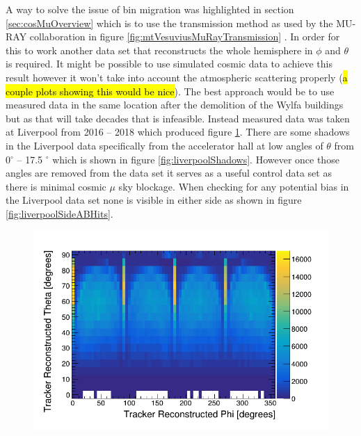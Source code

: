 A way to solve the issue of bin migration was highlighted in section \ref{sec:cosMuOverview} which is to use the transmission method as used by the MU-RAY collaboration in figure \ref{fig:mtVesuviusMuRayTransmission} \cite{Ambrosino_2014}. In order for this to work  another data set that reconstructs the whole hemisphere in $\phi$ and $\theta$ is required. It might be possible to use simulated cosmic data to achieve this result however it won't take into account the atmospheric scattering properly (\hl{a couple plots showing this would be nice}). The best approach would be to use measured data in the same location after the demolition of the Wylfa buildings but as that will take decades that is infeasible. Instead measured data was taken at Liverpool from 2016 -- 2018 which produced figure \ref{fig:pVsTLiverpoolReversed}. There are some shadows in the Liverpool data specifically from the accelerator hall at low angles of $\theta$ from 0$^\circ$ -- 17.5 $^\circ$ which is shown in figure \ref{fig:liverpoolShadows}. However once those angles are removed from the data set it serves as a useful control data set as there is minimal cosmic $\mu$ sky blockage. When checking for any potential bias in the Liverpool data set none is visible in either side as shown in figure \ref{fig:liverpoolSideABHits}. 

\begin{figure}[htbp]
 \centering
 \includegraphics[width=0.7\linewidth]{Chapter5/Figs/Raster/pVsTLiverpoolReversed.png}
 \label{fig:pVsTLiverpoolReversed}
\end{figure}

